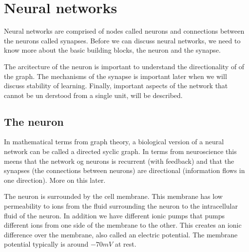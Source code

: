 

\section{Neural networks}

Neural networks are comprised of nodes called neurons and connections between the neurons called synapses. 
Before we can discuss neural networks, we need to know more about the basic building blocks, the neuron and the synapse. 

The arcitecture of the neuron is important to understand the directionality of of the graph. The mechanisms of the synapse is important later when we will discuss stability of learning. 
Finally, important aspects of the network that cannot be un derstood from a single unit, will be described.


\subsection{The neuron}
In mathematical terms from graph theory, a biological version of a neural network can be called a directed syclic graph. 
In terms from neuroscience this meens that the network og neurons is recurrent (with feedback) and that the synapses (the connections between neurons) are directional (information flows in one direction). More on this later.


The neuron is surrounded by the cell membrane. This membrane has low permeability to ions from the fluid surrounding the neuron to the intracellular fluid of the neuron.
In addition we have different ionic pumps that pumps different ions from one side of the membrane to the other. This creates an ionic difference over the membrane, also called an electric potential.
The membrane potential typically is around $-70mV$ at rest.

